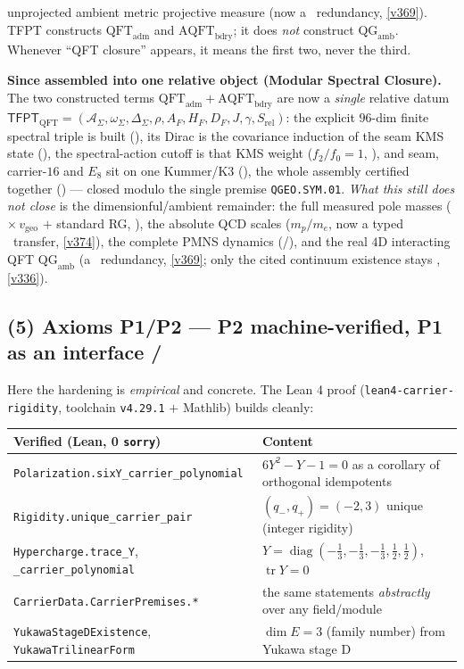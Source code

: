 unprojected ambient metric projective measure (now a \mC\ redundancy, \vref{v369}). TFPT constructs $\mathrm{QFT}_{\mathrm{adm}}$ and
$\mathrm{AQFT}_{\mathrm{bdry}}$; it does \emph{not} construct $\mathrm{QG}_{\mathrm{amb}}$. Whenever ``QFT
closure'' appears, it means the first two, never the third.
\par\smallskip\noindent\textbf{Since assembled into one relative object (Modular Spectral Closure).} The two
constructed terms $\mathrm{QFT}_{\mathrm{adm}}+\mathrm{AQFT}_{\mathrm{bdry}}$ are now a \emph{single} relative
datum $\mathsf{TFPT}_{\mathrm{QFT}}=(\mathcal A_\Sigma,\omega_\Sigma,\Delta_\Sigma,\rho,A_F,H_F,D_F,J,\gamma,
S_{\mathrm{rel}})$: the explicit $96$-dim finite spectral triple is built (),
its Dirac is the covariance induction of the seam KMS state (), the
spectral-action cutoff is that KMS weight ($f_2/f_0{=}1$, ), and seam,
carrier-$16$ and $E_8$ sit on one Kummer/K3 (), the whole assembly
certified together () --- closed modulo the single premise
\texttt{QGEO.SYM.01}. \emph{What this still does \emph{not} close} is the dimensionful/ambient remainder: the
full measured pole masses ($\times\,v_{\mathrm{geo}}$ $+$ standard RG, \mC), the absolute QCD scales
($m_p/m_e$, now a typed \mC\ transfer, \vref{v374}), the complete PMNS dynamics (\mC/\mO), and the real $4$D
interacting QFT $\mathrm{QG}_{\mathrm{amb}}$ (a \mC\ redundancy, \vref{v369}; only the cited continuum existence
stays \mO, \vref{v336}).

\subsection*{(5) Axioms P1/P2 --- P2 machine-verified, P1 as an interface \mE/\mO}
Here the hardening is \emph{empirical} and concrete. The Lean 4 proof (\texttt{lean4-carrier-rigidity},
toolchain \texttt{v4.29.1} $+$ Mathlib) builds cleanly:
\begin{center}\small
\renewcommand{\arraystretch}{1.15}
\begin{tabularx}{\linewidth}{@{}lY@{}}
\toprule
\textbf{Verified (Lean, 0 \texttt{sorry})} & \textbf{Content} \\
\midrule
\texttt{Polarization.sixY\_carrier\_polynomial} & $6Y^2-Y-1=0$ as a corollary of orthogonal idempotents \\
\texttt{Rigidity.unique\_carrier\_pair} & $(q_-,q_+)=(-2,3)$ unique (integer rigidity) \\
\texttt{Hypercharge.trace\_Y}, \texttt{\_carrier\_polynomial} & $Y=\operatorname{diag}(-\tfrac13,-\tfrac13,-\tfrac13,\tfrac12,\tfrac12)$, $\operatorname{tr}Y=0$ \\
\texttt{CarrierData.CarrierPremises.*} & the same statements \emph{abstractly} over any field/module \\
\texttt{YukawaStageDExistence}, \texttt{YukawaTrilinearForm} & $\dim E=3$ (family number) from Yukawa stage D \\
\bottomrule
\end{tabularx}
\end{center}


